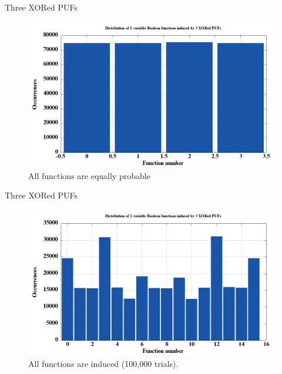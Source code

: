 \documentclass[10pt, compress]{beamer}
\begin{document}
\begin{frame}{Three XORed PUFs}
    \begin{figure}
        \centering
        \includegraphics[width=\textwidth]{figures/dist/distribution_of_1-variable_boolean_functions_induced_by_3_xored_pufs.png}
        \caption{All functions are equally probable}
    \end{figure}
\end{frame}

\begin{frame}{Three XORed PUFs}
    \begin{figure}
        \centering
        \includegraphics[width=\textwidth]{figures/dist/distribution_of_2-variable_boolean_functions_induced_by_3_xored_pufs.png}
        \caption{All functions are induced (100,000 trials).}
    \end{figure}
\end{frame}
\end{document}
